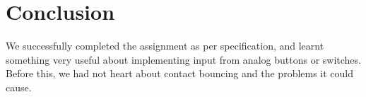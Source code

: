\section{Conclusion}
We successfully completed the assignment as per specification, and learnt something very useful about implementing input from analog buttons or switches. Before this, we had not heart about contact bouncing and the problems it could cause.
